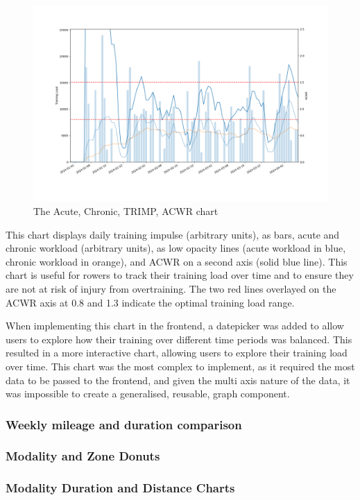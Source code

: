 \begin{figure}[htbp]
  \centering
  \includegraphics[width=\linewidth]{figures/acwr.png}
  \captionsetup{justification=centering}
  \caption[ACWR Chart]{\label{fig:acwr}The Acute, Chronic, TRIMP, ACWR chart}
\end{figure}
This chart displays daily training impulse (arbitrary units), as bars, acute and chronic workload (arbitrary units), as low opacity lines (acute workload in blue, chronic workload in orange), and ACWR on a second axis (solid blue line). This chart is useful for rowers to track their training load over time and to ensure they are not at risk of injury from overtraining. The two red lines overlayed on the ACWR axis at 0.8 and 1.3 indicate the optimal training load range. 

When implementing this chart in the frontend, a datepicker was added to allow users to explore how their training over different time periods was balanced. This resulted in a more interactive chart, allowing users to explore their training load over time. This chart was the most complex to implement, as it required the most data to be passed to the frontend, and given the multi axis nature of the data, it was impossible to create a generalised, reusable, graph component.  

\subsubsection{Weekly mileage and duration comparison}
\subsubsection{Modality and Zone Donuts}
\subsubsection{Modality Duration and Distance Charts}
